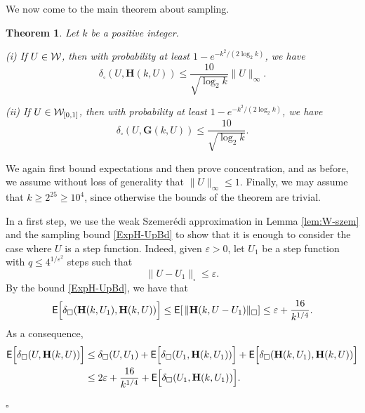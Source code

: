\documentclass[12pt]{article}
\newtheorem{theorem}{Theorem}[section]
\numberwithin{equation}{section}
\newenvironment{proof}{\medskip\noindent{\bf Proof.
}}{\hfill$\square$\medskip}
\def\eps{\varepsilon}
\def\E{{\sf E}}
\def\bG{{\mathbf G}}
\def\bH{{\mathbf H}}
\def\WWz{{\WW_{[0,1]}}}
\begin{document}
We now come to the main theorem about sampling.

\begin{theorem}\label{thm:sample2}
Let $k$ be a positive integer.

\smallskip

{\rm (i)} If  $U\in{\cal W}$, then with probability at least
$1-e^{-k^2/(2\log_2 k)}$, we have
\[
\delta_\square(U, \bH(k,U))
\leq \frac{10}{\sqrt{\log_2 k}}\|U\|_\infty.
\]

\smallskip

{\rm (ii)} If  $U\in\WWz$, then with probability at least
$1-e^{-k^2/(2\log_2 k)}$, we have
\[
\delta_\square(U, \bG(k,U))
\leq \frac{10}{\sqrt{\log_2 k}}.
\]
\end{theorem}

\begin{proof}
We again first bound expectations and then prove concentration, and
as before, we assume without loss of generality that
$\|U\|_\infty\leq 1$. Finally, we may assume that $k\geq 2^{25}\geq
10^4$, since otherwise the bounds of the theorem are trivial.

{In a first step, we use the weak Szemer\'edi approximation in Lemma
\ref{lem:W-szem} and the sampling bound \eqref{ExpH-UpBd} to show
that it is enough to consider the case where $U$ is a step function.
Indeed, given $\eps>0$, let $U_1$ be a step function  with $q\leq
4^{1/\eps^{2}}$ steps such that
\begin{equation}\label{U-U1}
\|U-U_1\|_\square \leq \eps.
\end{equation}
By the bound \eqref{ExpH-UpBd},
we have that
\[
\E\Bigl[\delta_\square(\bH(k,U_1), \bH(k, U))\Bigr]
\leq \E[\,\|\bH(k,U-U_1)\|_\square]\leq\eps
+\frac{16}{k^{1/4}}.
\]
As a consequence,
\begin{equation}
\label{step-reduction}
\begin{aligned}
\E\Bigl[\delta_\square(U, \bH(k,U))\Bigr]
&\leq \delta_\square(U, U_1) +
\E\Bigl[\delta_\square(U_1, \bH(k,U_1))\Bigr]
+\E\Bigl[ \delta_\square(\bH(k,U_1), \bH(k,U))\Bigr]
\\
&\leq
2\eps+\frac{16}{k^{1/4}}+\E\Bigl[\delta_\square(U_1, \bH(k,U_1))\Bigr].
\end{aligned}
\end{equation}

}
\end{proof}
\end{document}
